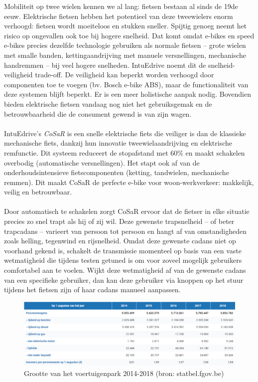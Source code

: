 \documentclass[12pt,a4paper,oneside]{book}
\begin{document}
Mobiliteit op twee wielen kennen we al lang: fietsen bestaan al sinds de 19de eeuw. Elektrische fietsen hebben het potentieel van deze tweewielers enorm verhoogd: fietsen wordt moeiteloos en stukken sneller. Spijtig genoeg neemt het risico op ongevallen ook toe bij hogere snelheid. Dat komt omdat e-bikes en speed e-bikes precies dezelfde technologie gebruiken als normale fietsen – grote wielen met smalle banden, kettingaandrijving met manuele versnellingen, mechanische handremmen – bij veel hogere snelheden. IntuEdrive noemt dit de snelheid-veiligheid trade-off. De veiligheid kan beperkt worden verhoogd door componenten toe te voegen (bv. Bosch e-bike ABS), maar de functionaliteit van deze systemen blijft beperkt. Er is een meer holistische aanpak nodig. Bovendien bieden elektrische fietsen vandaag nog niet het gebruiksgemak en de betrouwbaarheid die de consument gewend is van zijn wagen.
\\\\
IntuEdrive’s \textit{CoSaR} is een snelle elektrische fiets die veiliger is dan de klassieke mechanische fiets, dankzij hun innovatie tweewielaandrijving en elektrische remfunctie. Dit systeem reduceert de stopafstand met 60\% en maakt schakelen overbodig (automatische versnellingen). Het stapt ook af van de onderhoudsintensieve fietscomponenten (ketting, tandwielen, mechanische remmen). Dit maakt CoSaR de perfecte e-bike voor woon-werkverkeer: makkelijk, veilig en betrouwbaar.
\\\\
Door automatisch te schakelen zorgt CoSaR ervoor dat de fietser in elke situatie precies zo snel trapt als hij of zij wil. Deze gewenste trapsnelheid – of beter trapcadans – varieert van persoon tot persoon en hangt af van omstandigheden zoals helling, tegenwind en rijsnelheid. Omdat deze gewenste cadans niet op voorhand gekend is, schakelt de transmissie momenteel op basis van een vaste wetmatigheid die tijdens testen getuned is om voor zoveel mogelijk gebruikers comfortabel aan te voelen. Wijkt deze wetmatigheid af van de gewenste cadans van een specifieke gebruiker, dan kan deze gebruiker via knoppen op het stuur tijdens het fietsen zijn of haar cadans manueel aanpassen.
\\
\begin{figure}
  \includegraphics[width=\linewidth]{images/wagenpark_belgie.png}
  \caption{Grootte van het voertuigenpark 2014-2018 (bron: statbel.fgov.be)}
  \label{fig:wagenpark}
\end{figure}
\end{document}
